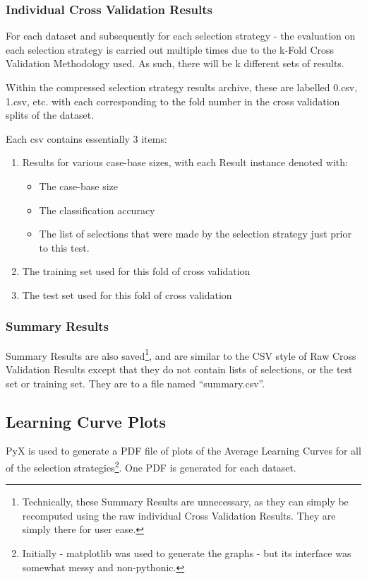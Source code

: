 \documentclass[a4paper,11pt]{report}
\begin{document}
\subsubsection{Individual Cross Validation Results}
For each dataset and subsequently for each selection strategy - the evaluation on each selection strategy is carried out multiple times due to the k-Fold Cross Validation Methodology used. As such, there will be k different sets of results. 

Within the compressed selection strategy results archive, these are labelled 0.csv, 1.csv, etc. with each corresponding to the fold number in the cross validation splits of the dataset.

Each csv contains essentially 3 items:

\begin{enumerate}
	\item Results for various case-base sizes, with each Result instance denoted with:
		\begin{itemize}
			\item The case-base size
			\item The classification accuracy
			\item The list of selections that were made by the selection strategy just prior to this test.
		\end{itemize}
	\item The training set used for this fold of cross validation
	\item The test set used for this fold of cross validation
\end{enumerate}

\subsubsection{Summary Results}
Summary Results are also saved\footnote{Technically, these Summary Results are unnecessary, as they can simply be recomputed using the raw individual Cross Validation Results. They are simply there for user ease.}, and are similar to the CSV style of Raw Cross Validation Results except that they do not contain lists of selections, or the test set or training set. They are to a file named ``summary.csv''.

\subsection{Learning Curve Plots}
PyX \citep{prog:pyx} is used to generate a PDF file of plots of the Average Learning Curves for all of the selection strategies\footnote{Initially - matplotlib \citep{prog:matplotlib} was used to generate the graphs - but its interface was somewhat messy and non-pythonic.}. One PDF is generated for each dataset.
\end{document}
